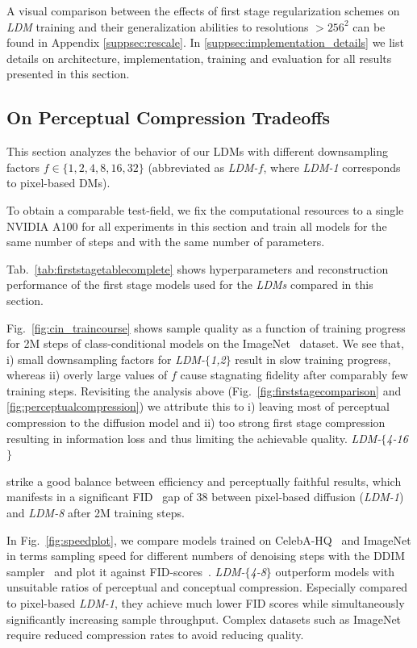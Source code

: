 A visual comparison between the effects of first stage regularization schemes on \emph{LDM} training and their generalization abilities to resolutions $>256^2$ can be found in Appendix \ref{suppsec:rescale}. In \ref{suppsec:implementation_details} we list details on architecture, implementation, training and evaluation for all results presented in this section.

\subsection{On Perceptual Compression Tradeoffs}
\label{subsec:reduced_compute}

This section analyzes the behavior of our LDMs with different downsampling factors $f\in\{1,2,4,8,16,32\}$ (abbreviated as \emph{LDM-}$f$, where
\emph{LDM-1} corresponds to pixel-based DMs).

To obtain a comparable test-field, we fix the computational resources to a single NVIDIA A100 for all experiments in this section and train all models for the same number of steps and with the same number of parameters.

Tab.~\ref{tab:firststagetablecomplete} shows hyperparameters and reconstruction performance of the first stage models used for the \emph{LDMs} compared in this section.

Fig.~\ref{fig:cin_traincourse} shows sample quality as a function of training progress for 2M steps of class-conditional models on the ImageNet~\cite{DBLP:conf/cvpr/DengDSLL009} dataset. We see that, i) small downsampling factors for \emph{LDM-}$\{$\emph{1,2}$\}$ result in slow training progress, whereas ii) overly large values of $f$ cause stagnating fidelity after comparably few training steps. Revisiting the analysis above
(Fig.~\ref{fig:firststagecomparison} and \ref{fig:perceptualcompression}) we attribute this to i) leaving most of perceptual compression to the diffusion model and ii) too strong first stage compression resulting in information loss and thus limiting the achievable quality. \emph{LDM-$\{$4-16$\}$}

strike a good balance between efficiency and perceptually faithful results, which manifests in a significant FID~\cite{FID} gap of 38 between pixel-based diffusion (\emph{LDM-1}) and \emph{LDM-8} after 2M training steps.

In Fig.~\ref{fig:speedplot}, we compare models trained on CelebA-HQ~\cite{DBLP:journals/corr/abs-1710-10196} and ImageNet in terms sampling speed for different numbers of denoising steps with the DDIM sampler~\cite{DBLP:conf/iclr/SongME21} and plot it against FID-scores~\cite{FID}.
\emph{LDM-$\{$4-8$\}$} outperform models with unsuitable ratios of perceptual and conceptual compression. Especially compared to pixel-based \emph{LDM-1}, they achieve much lower FID scores while simultaneously significantly increasing sample throughput. Complex datasets such as ImageNet require reduced compression rates to avoid reducing quality.

